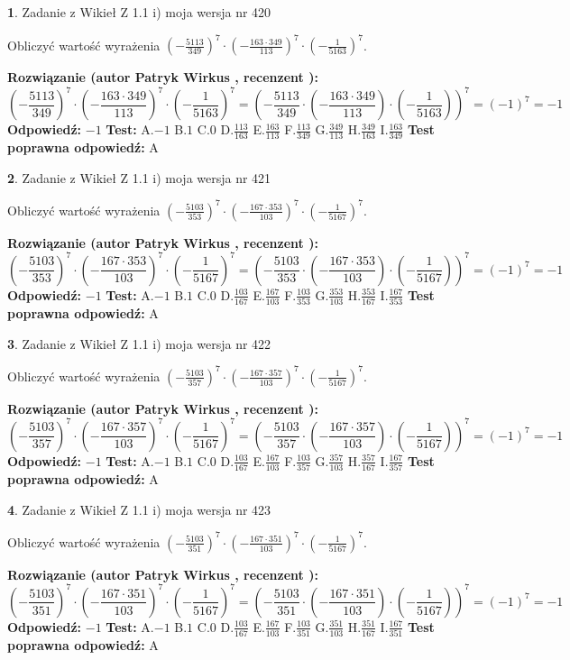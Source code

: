 \documentclass[12pt, a4paper]{article}
\theoremstyle{definition} %
\newtheorem{zad}{}
\newcommand{\zadStart}[1]{\begin{zad}#1\newline}
\newcommand{\zadStop}{\end{zad}}
\newcommand{\rozwStart}[2]{\noindent \textbf{Rozwiązanie (autor #1 , recenzent #2): }\newline}
\newcommand{\rozwStop}{\newline}
\newcommand{\odpStart}{\noindent \textbf{Odpowiedź:}\newline}
\newcommand{\odpStop}{\newline}
\newcommand{\testStart}{\noindent \textbf{Test:}\newline}
\newcommand{\testStop}{\newline}
\newcommand{\kluczStart}{\noindent \textbf{Test poprawna odpowiedź:}\newline}
\newcommand{\kluczStop}{\newline}
\begin{document}
\zadStart{Zadanie z Wikieł Z 1.1 i) moja wersja nr 420}

Obliczyć wartość wyrażenia $(-\frac{5113}{349})^{7} \cdot (-\frac{163 \cdot 349}{113})^{7} \cdot (-\frac{1}{5163})^{7}$.
\zadStop
\rozwStart{Patryk Wirkus}{}
$$(-\frac{5113}{349})^{7} \cdot (-\frac{163 \cdot 349}{113})^{7} \cdot (-\frac{1}{5163})^{7} = (-\frac{5113}{349} \cdot (-\frac{163 \cdot 349}{113}) \cdot (-\frac{1}{5163}))^{7} = (-1)^{7} = -1$$
\rozwStop
\odpStart
$-1$
\odpStop
\testStart
A.$-1$ B.$1$ C.$0$ D.$\frac{113}{163}$ E.$\frac{163}{113}$
F.$\frac{113}{349}$ G.$\frac{349}{113}$
H.$\frac{349}{163}$
I.$\frac{163}{349}$
\testStop
\kluczStart
A
\kluczStop



\zadStart{Zadanie z Wikieł Z 1.1 i) moja wersja nr 421}

Obliczyć wartość wyrażenia $(-\frac{5103}{353})^{7} \cdot (-\frac{167 \cdot 353}{103})^{7} \cdot (-\frac{1}{5167})^{7}$.
\zadStop
\rozwStart{Patryk Wirkus}{}
$$(-\frac{5103}{353})^{7} \cdot (-\frac{167 \cdot 353}{103})^{7} \cdot (-\frac{1}{5167})^{7} = (-\frac{5103}{353} \cdot (-\frac{167 \cdot 353}{103}) \cdot (-\frac{1}{5167}))^{7} = (-1)^{7} = -1$$
\rozwStop
\odpStart
$-1$
\odpStop
\testStart
A.$-1$ B.$1$ C.$0$ D.$\frac{103}{167}$ E.$\frac{167}{103}$
F.$\frac{103}{353}$ G.$\frac{353}{103}$
H.$\frac{353}{167}$
I.$\frac{167}{353}$
\testStop
\kluczStart
A
\kluczStop



\zadStart{Zadanie z Wikieł Z 1.1 i) moja wersja nr 422}

Obliczyć wartość wyrażenia $(-\frac{5103}{357})^{7} \cdot (-\frac{167 \cdot 357}{103})^{7} \cdot (-\frac{1}{5167})^{7}$.
\zadStop
\rozwStart{Patryk Wirkus}{}
$$(-\frac{5103}{357})^{7} \cdot (-\frac{167 \cdot 357}{103})^{7} \cdot (-\frac{1}{5167})^{7} = (-\frac{5103}{357} \cdot (-\frac{167 \cdot 357}{103}) \cdot (-\frac{1}{5167}))^{7} = (-1)^{7} = -1$$
\rozwStop
\odpStart
$-1$
\odpStop
\testStart
A.$-1$ B.$1$ C.$0$ D.$\frac{103}{167}$ E.$\frac{167}{103}$
F.$\frac{103}{357}$ G.$\frac{357}{103}$
H.$\frac{357}{167}$
I.$\frac{167}{357}$
\testStop
\kluczStart
A
\kluczStop



\zadStart{Zadanie z Wikieł Z 1.1 i) moja wersja nr 423}

Obliczyć wartość wyrażenia $(-\frac{5103}{351})^{7} \cdot (-\frac{167 \cdot 351}{103})^{7} \cdot (-\frac{1}{5167})^{7}$.
\zadStop
\rozwStart{Patryk Wirkus}{}
$$(-\frac{5103}{351})^{7} \cdot (-\frac{167 \cdot 351}{103})^{7} \cdot (-\frac{1}{5167})^{7} = (-\frac{5103}{351} \cdot (-\frac{167 \cdot 351}{103}) \cdot (-\frac{1}{5167}))^{7} = (-1)^{7} = -1$$
\rozwStop
\odpStart
$-1$
\odpStop
\testStart
A.$-1$ B.$1$ C.$0$ D.$\frac{103}{167}$ E.$\frac{167}{103}$
F.$\frac{103}{351}$ G.$\frac{351}{103}$
H.$\frac{351}{167}$
I.$\frac{167}{351}$
\testStop
\kluczStart
A
\kluczStop
\end{document}

